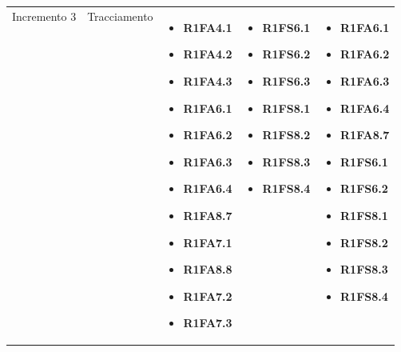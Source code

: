 {\begin{longtable}{C{2.5cm} C{3.2cm} C{2.8cm} C{2.8cm} C{2.8cm}}
Incremento 3 & Tracciamento & \begin{itemize}
    \item[ ] \textbf{R1FA4.1}
    \item[ ] \textbf{R1FA4.2}
    \item[ ] \textbf{R1FA4.3}
    \item[ ] \textbf{R1FA6.1}
    \item[ ] \textbf{R1FA6.2}
    \item[ ] \textbf{R1FA6.3}
    \item[ ] \textbf{R1FA6.4}
    \item[ ] \textbf{R1FA8.7}
    \item[ ] \textbf{R1FA7.1}
    \item[ ] \textbf{R1FA8.8}
    \item[ ] \textbf{R1FA7.2}
    \item[ ] \textbf{R1FA7.3}
\end{itemize}& \begin{itemize} 
    \item[ ] \textbf{R1FS6.1}
    \item[ ] \textbf{R1FS6.2}
    \item[ ] \textbf{R1FS6.3}
    \item[ ] \textbf{R1FS8.1}
    \item[ ] \textbf{R1FS8.2}
    \item[ ] \textbf{R1FS8.3}
    \item[ ] \textbf{R1FS8.4}

\end{itemize} & \begin{itemize} 
    \item[ ] \textbf{R1FA6.1}
    \item[ ] \textbf{R1FA6.2}
    \item[ ] \textbf{R1FA6.3}
    \item[ ] \textbf{R1FA6.4}
    \item[ ] \textbf{R1FA8.7}
    \item[ ] \textbf{R1FS6.1}
    \item[ ] \textbf{R1FS6.2}
    \item[ ] \textbf{R1FS8.1}
    \item[ ] \textbf{R1FS8.2}
    \item[ ] \textbf{R1FS8.3}
    \item[ ] \textbf{R1FS8.4}
\end{itemize}\\


\end{longtable}}
